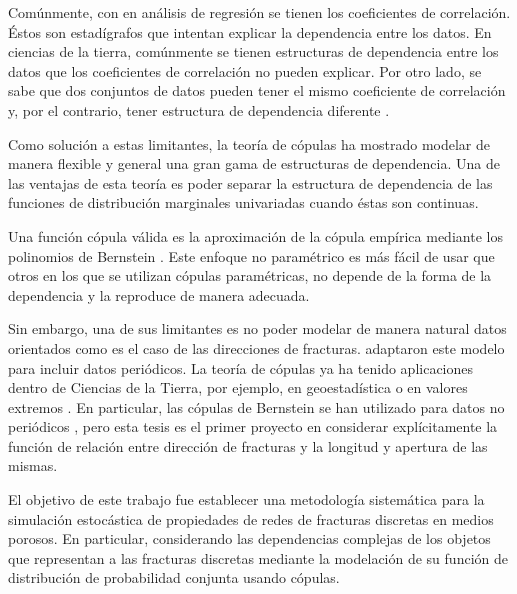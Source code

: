 Com\'unmente, con en an\'alisis de regresi\'on se tienen los coeficientes de correlaci\'on.
\'Estos son estad\'igrafos que intentan explicar la dependencia entre los datos. En ciencias de la tierra, com\'unmente se tienen estructuras de dependencia entre los datos que los coeficientes de correlaci\'on no pueden explicar.
Por otro lado, se sabe que dos conjuntos de datos pueden tener el mismo coeficiente de correlaci\'on y, por el contrario, tener estructura de dependencia diferente \citep{kat_dangers_2003,embrechts_correlation:_1999,king_how_1986,chernih_beyond_2007}.

Como soluci\'on a estas limitantes, la teor\'ia de c\'opulas ha mostrado modelar de manera flexible y general una gran gama de estructuras de dependencia.
Una de las ventajas de esta teor\'ia es poder separar la estructura de dependencia de las funciones de distribuci\'on marginales univariadas \citep{sklar_fonctions_1959} cuando \'estas son continuas.

Una funci\'on c\'opula v\'alida es la aproximaci\'on de la c\'opula emp\'irica \citep{deheuvels_fonction_1979,fermanian_weak_2004,berghaus_weak_2017,radulovic_weak_2017,bucher_empirical_2011,carnicero_non-parametric_2013} mediante los polinomios de Bernstein \citep{sancetta_bernstein_2004}.
Este enfoque no param\'etrico es m\'as  f\'acil de usar que otros en los que se utilizan c\'opulas param\'etricas, no depende de la forma de la dependencia y la reproduce de manera adecuada.

Sin embargo, una de sus limitantes es no poder modelar de manera natural datos orientados como es el caso de las direcciones de fracturas. \cite{carnicero_non-parametric_2013} adaptaron este modelo para incluir datos peri\'odicos. 
La teor\'ia de c\'opulas ya ha tenido aplicaciones dentro de Ciencias de la Tierra, por ejemplo, en geoestad\'istica \citep{diaz-viera_stochastic_2005,bardossy_copula-based_2006,haslauer_application_2010,kazianka_spatial_2010,kazianka_bayesian_2011,kazianka_spatialcopula:_2012} o en valores extremos \citep{salvadori_extremes_2007}.
En particular, las c\'opulas de Bernstein se han utilizado para datos no peri\'odicos \citep{hernandez-maldonado_trivariate_2012,hernandez-maldonado_joint_2012,erdely_nonparametric_2009}, pero esta tesis es el primer proyecto en considerar expl\'icitamente la funci\'on de relaci\'on entre direcci\'on de fracturas y la longitud y apertura de las mismas.

El objetivo de este trabajo fue establecer una metodolog\'ia sistem\'atica para la simulaci\'on estoc\'astica de propiedades de redes de fracturas discretas en medios porosos.
En particular, considerando las dependencias complejas de los objetos que representan a las fracturas discretas mediante la modelaci\'on de su funci\'on de distribuci\'on de probabilidad conjunta usando c\'opulas.

